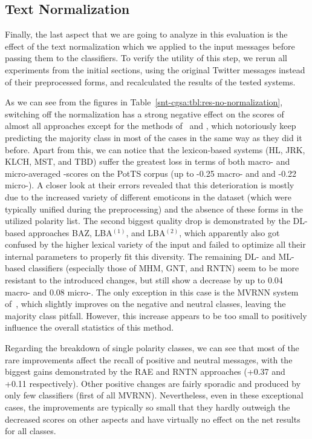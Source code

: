 \subsection{Text Normalization}

Finally, the last aspect that we are going to analyze in this
evaluation is the effect of the text normalization which we applied to
the input messages before passing them to the classifiers.  To verify
the utility of this step, we rerun all experiments from the initial
sections, using the original Twitter messages instead of their
preprocessed forms, and recalculated the results of the tested
systems.

As we can see from the figures in
Table~\ref{snt-cgsa:tbl:res-no-normalization}, switching off the
normalization has a strong negative effect on the scores of almost all
approaches except for the methods of~\citet{Yessenalina:10} and
\citet{Socher:12,Socher:13}, which notoriously keep predicting the
majority class in most of the cases in the same way as they did it
before.  Apart from this, we can notice that the lexicon-based systems
(HL, JRK, KLCH, MST, and TBD) suffer the greatest loss in terms of
both macro- and micro-averaged \F{}-scores on the PotTS corpus (up to
-0.25 macro- and and -0.22 micro-\F{}).  A closer look at their errors
revealed that this deterioration is mostly due to the increased
variety of different emoticons in the dataset (which were typically
unified during the preprocessing) and the absence of these forms in
the utilized polarity list.  The second biggest quality drop is
demonstrated by the DL-based approaches BAZ, LBA$^{(1)}$, and
LBA$^{(2)}$, which apparently also got confused by the higher lexical
variety of the input and failed to optimize all their internal
parameters to properly fit this diversity.  The remaining DL- and
ML-based classifiers (especially those of MHM, GNT, and RNTN) seem to
be more resistant to the introduced changes, but still show a decrease
by up to 0.04 macro- and 0.08 micro-\F{}.  The only exception in this
case is the MVRNN system of~\citet{Socher:12}, which slightly improves
on the negative and neutral classes, leaving the majority class
pitfall.  However, this increase appears to be too small to positively
influence the overall statistics of this method.

Regarding the breakdown of single polarity classes, we can see that
most of the rare improvements affect the recall of positive and
neutral messages, with the biggest gains demonstrated by the RAE and
RNTN approaches (+0.37 and +0.11 respectively).  Other positive
changes are fairly sporadic and produced by only few classifiers
(first of all MVRNN).  Nevertheless, even in these exceptional cases,
the improvements are typically so small that they hardly outweigh the
decreased scores on other aspects and have virtually no effect on the
net results for all classes.

